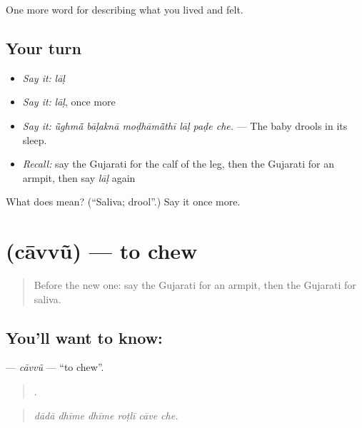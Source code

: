 \begin{grammarlens}[title={What you've built}]
One more word for describing what you lived and felt.
\end{grammarlens}

\subsection*{Your turn}
\begin{itemize}
\raggedright
  \item \emph{Say it:} \emph{lāḷ}
  \item \emph{Say it:} \emph{lāḷ}, once more
  \item \emph{Say it:} \emph{ū̃ghmā̃ bāḷaknā moḍhāmā̃thī lāḷ paḍe che.} — The baby drools in its sleep.
  \item \emph{Recall:} say the Gujarati for the calf of the leg, then the Gujarati for an armpit, then say \emph{lāḷ} again
\end{itemize}

\begin{tcolorbox}[breakable,colback=teal!4,colframe=teal!35!black,title={Before you move on}]
What does  mean? (\textquotedblleft{}Saliva; drool\textquotedblright{}.) Say it once more.
\end{tcolorbox}
\section[\texorpdfstring{\gu{ચાવવું} (cāvvũ)}{ચાવવું (cāvvũ)}]{ (cāvvũ) — to chew}

\label{lesson:GU-C474-cavvu}



\begin{quote}
Before the new one: say the Gujarati for an armpit, then the Gujarati for saliva.
\end{quote}

\subsection*{You'll want to know: }
\textbf{} — \emph{cāvvũ} — \textquotedblleft{}to chew\textquotedblright{}.

\begin{quote}
     .
\end{quote}

\begin{quote}
\emph{dādā dhīme dhīme roṭlī cāve che.}
\end{quote}

